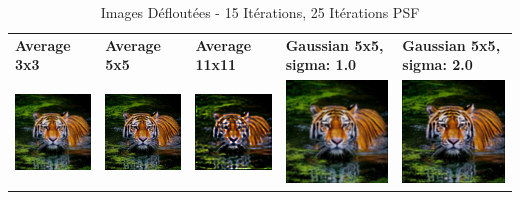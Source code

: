 \begin{table}[h!]
    \centering
    \captionsetup{justification=centering}
    \caption*{Images Défloutées - 15 Itérations, 25 Itérations PSF}
    \begin{tabular}{>{\centering\arraybackslash}m{3cm} >{\centering\arraybackslash}m{3cm} >{\centering\arraybackslash}m{3cm} >{\centering\arraybackslash}m{3cm} >{\centering\arraybackslash}m{3cm}}
        \textbf{Average 3x3}                                                                                                    & \textbf{Average 5x5} & \textbf{Average 11x11} & \textbf{Gaussian 5x5, sigma: 1.0} & \textbf{Gaussian 5x5, sigma: 2.0} \\
        \includegraphics[width=3cm]{images/blind_processed/tiger/average_3x3/tiger_unblurred_15-iter_25-psf-iter.png}           &
        \includegraphics[width=3cm]{images/blind_processed/tiger/average_5x5/tiger_unblurred_15-iter_25-psf-iter.png}           &
        \includegraphics[width=3cm]{images/blind_processed/tiger/average_11x11/tiger_unblurred_15-iter_25-psf-iter.png}         &
        \includegraphics[width=3cm]{images/blind_processed/tiger/gaussian_5x5_sigma1.0/tiger_unblurred_15-iter_25-psf-iter.png} &
        \includegraphics[width=3cm]{images/blind_processed/tiger/gaussian_5x5_sigma2.0/tiger_unblurred_15-iter_25-psf-iter.png}                                                                                                                         \\
    \end{tabular}
\end{table}

